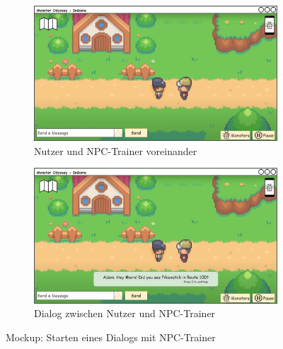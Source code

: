 \begin{figure}[H]
    \centering
    \begin{subfigure}[b]{0.4\textwidth}
        \includegraphics[width=\textwidth]{images/mockups/General/PlayerAndPlayer}
        \caption{Nutzer und NPC-Trainer voreinander}
        \label{fig: User and NPC-Trainer}
    \end{subfigure}
    \hfill
    \begin{subfigure}[b]{0.4\textwidth}
        \includegraphics[width=\textwidth]{images/mockups/General/PlayerAndNPCMessage}
        \caption{Dialog zwischen Nutzer und NPC-Trainer}
        \label{fig: Dialog User and NPC-Trainer}
    \end{subfigure}
    \caption{Mockup: Starten eines Dialogs mit NPC-Trainer}
    \label{fig: Starten eines Dialogs mit NPC-Trainer}
\end{figure}
